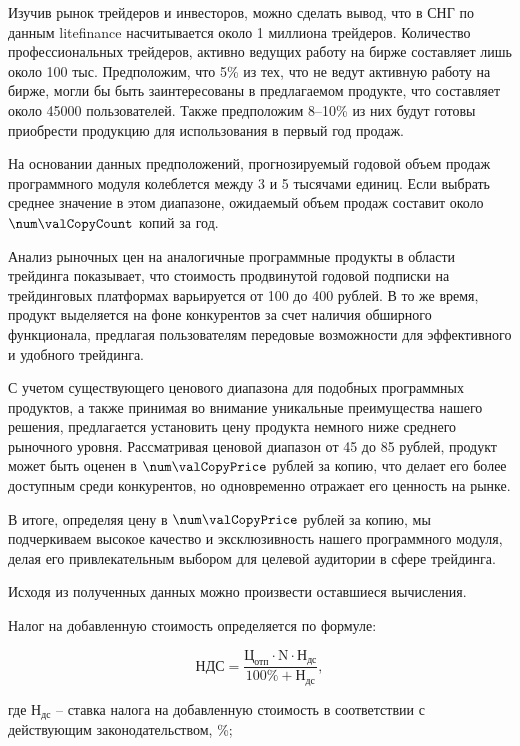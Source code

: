 
Изучив рынок трейдеров и инвесторов, можно сделать вывод, что в СНГ по данным litefinance насчитывается около 1 миллиона трейдеров.
Количество профессиональных трейдеров, активно ведущих работу на бирже составляет лишь около 100 тыс.
Предположим, что 5\% из тех, что не ведут активную работу на бирже, могли бы быть заинтересованы в предлагаемом продукте, что составляет около 45000 пользователей.
Также предположим 8--10\% из них будут готовы приобрести продукцию для использования в первый год продаж.

На основании данных предположений, прогнозируемый годовой объем продаж программного модуля колеблется между 3 и 5 тысячами единиц.
Если выбрать среднее значение в этом диапазоне, ожидаемый объем продаж составит около $ \num\valCopyCount $ копий за год.

Анализ рыночных цен на аналогичные программные продукты в области трейдинга показывает, что стоимость продвинутой годовой подписки на трейдинговых платформах варьируется от 100 до 400 рублей.
В то же время, продукт выделяется на фоне конкурентов за счет наличия обширного функционала,
предлагая пользователям передовые возможности для эффективного и удобного трейдинга.

С учетом существующего ценового диапазона для подобных программных продуктов,
а также принимая во внимание уникальные преимущества нашего решения, предлагается установить цену продукта немного ниже среднего рыночного уровня.
Рассматривая ценовой диапазон от 45 до 85 рублей, продукт может быть оценен в $ \num\valCopyPrice $ рублей за копию,
что делает его более доступным среди конкурентов, но одновременно отражает его ценность на рынке.

В итоге, определяя цену в $ \num\valCopyPrice $ рублей за копию, мы подчеркиваем высокое качество и эксклюзивность нашего программного
модуля, делая его привлекательным выбором для целевой аудитории в сфере трейдинга.

Исходя из полученных данных можно произвести оставшиеся вычисления.

Налог на добавленную стоимость определяется по формуле:

\begin{equation}
  \label{eq:econ:nds}
    \text{НДС} = \frac{\text{Ц}_\text{отп} \cdot \text{N} \cdot \text{Н}_\text{дс}}
    {100 \% + \text{Н}_\text{дс}},
\end{equation}
\begin{explanationx}
  \item[где] $ \text{Н}_\text{дс} $ -- ставка налога на добавленную стоимость в соответствии с
действующим законодательством, \%;
\end{explanationx}

